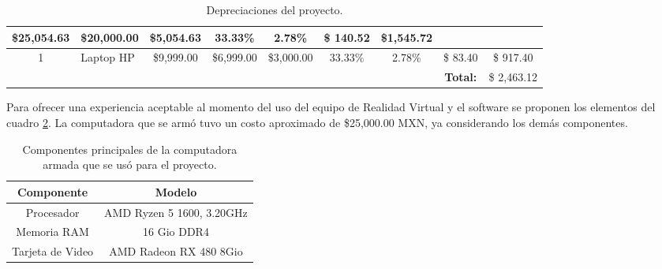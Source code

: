 \begin{table}[H]
{\begin{tabular}{clccccc|c|c|}
  \multicolumn{1}{c|}{\$25,054.63} &
  \multicolumn{1}{c|}{\$20,000.00} &
  \multicolumn{1}{c|}{\$5,054.63} &
  \multicolumn{1}{c|}{33.33\%} &
  2.78\% &
  \$ 140.52 &
  \$1,545.72 \\ \hline
\multicolumn{1}{|c|}{\cellcolor[HTML]{C0C0C0}1} &
  \multicolumn{1}{l|}{Laptop HP} &
  \multicolumn{1}{c|}{\$9,999.00} &
  \multicolumn{1}{c|}{\$6,999.00} &
  \multicolumn{1}{c|}{\$3,000.00} &
  \multicolumn{1}{c|}{33.33\%} &
  2.78\% &
  \$ 83.40 &
  \$ 917.40 \\ \hline
\multicolumn{7}{l}{} &
  \textbf{Total:} &
  \$ 2,463.12 \\ \cline{8-9} 
\end{tabular}
}
\caption{Depreciaciones del proyecto.}
\label{tab:t25}
\end{table}

Para ofrecer una experiencia aceptable al momento del uso del equipo de Realidad Virtual 
y el software se proponen los elementos del cuadro \ref{tab:componentes}. La computadora 
que se armó tuvo un costo aproximado de \$25,000.00 MXN, ya considerando los demás componentes.

\begin{table}
\centering
\begin{tabular}{|c|c|}\hline
{\bf Componente} & {\bf Modelo}\\\hline
Procesador & AMD Ryzen 5 1600, 3.20GHz\\\hline
Memoria RAM & 16 Gio DDR4\\\hline
Tarjeta de Video & AMD Radeon RX 480 8Gio\\\hline
\end{tabular}
\caption{Componentes principales de la computadora armada que se usó para el proyecto.}
\label{tab:componentes}
\end{table}

